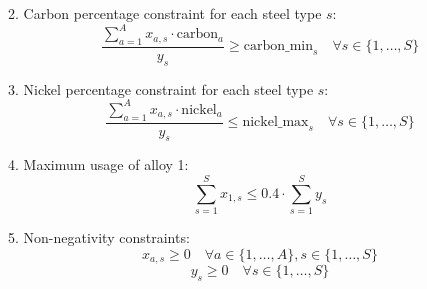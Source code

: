 \documentclass{article}
\begin{document}
2. Carbon percentage constraint for each steel type \( s \):
\[
\frac{\sum_{a=1}^{A} x_{a,s} \cdot \text{carbon}_a}{y_s} \geq \text{carbon\_min}_s \quad \forall s \in \{1, \ldots, S\}
\]

3. Nickel percentage constraint for each steel type \( s \):
\[
\frac{\sum_{a=1}^{A} x_{a,s} \cdot \text{nickel}_a}{y_s} \leq \text{nickel\_max}_s \quad \forall s \in \{1, \ldots, S\}
\]

4. Maximum usage of alloy 1:
\[
\sum_{s=1}^{S} x_{1,s} \leq 0.4 \cdot \sum_{s=1}^{S} y_s
\]

5. Non-negativity constraints:
\[
x_{a,s} \geq 0 \quad \forall a \in \{1, \ldots, A\}, s \in \{1, \ldots, S\}
\]
\[
y_s \geq 0 \quad \forall s \in \{1, \ldots, S\}
\]
\end{document}
